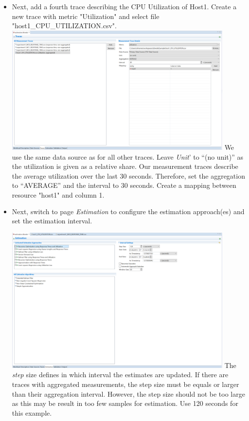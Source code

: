 \begin{itemize}
	\item Next, add a fourth trace describing the CPU Utilization of Host1. Create a new trace with metric "Utilization" and select file "host1\_CPU\_UTILIZATION.csv". 
    \newline
    \includegraphics[width=0.9\textwidth]{screenshots/Screenshot25}
    \newline
    We use the same data source as for all other traces. Leave \emph{Unit}' to ``(no unit)'' as the utilization is given as a relative share. Our measurement traces describe the average utilization over the last 30 seconds. Therefore, set the aggregation to ``AVERAGE'' and the interval to 30 seconds. Create a mapping between resource "host1" and column 1.
   
    
	\item Next, switch to page \emph{Estimation} to configure the estimation approach(es) and set the estimation interval.\newline
    
			\includegraphics[width=0.9\textwidth]{screenshots/Screenshot19}	 \newline \newline
			The \emph{step} size defines in which interval the estimates are updated. If there are traces with aggregated measurements, the step size must be equals or larger than their aggregation interval. However, the step size should not be too large as this may be result in too few samples for estimation. Use 120 seconds for this example. 
            

\end{itemize}
